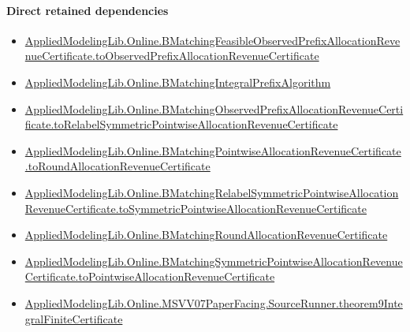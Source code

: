 \documentclass[10pt]{article}
\begin{document}
\paragraph{Direct retained dependencies}
\begin{itemize}\raggedright
\item \hyperlink{governing-declaration-26be68259782c8e2}{Applied\allowbreak{}Modeling\allowbreak{}Lib.\allowbreak{}Online.\allowbreak{}B\allowbreak{}Matching\allowbreak{}Feasible\allowbreak{}Observed\allowbreak{}Prefix\allowbreak{}Allocation\allowbreak{}Revenue\allowbreak{}Certificate.\allowbreak{}to\allowbreak{}Observed\allowbreak{}Prefix\allowbreak{}Allocation\allowbreak{}Revenue\allowbreak{}Certificate}
\item \hyperlink{governing-declaration-736ec20594878fea}{Applied\allowbreak{}Modeling\allowbreak{}Lib.\allowbreak{}Online.\allowbreak{}B\allowbreak{}Matching\allowbreak{}Integral\allowbreak{}Prefix\allowbreak{}Algorithm}
\item \hyperlink{governing-declaration-6c57a9ba136af21f}{Applied\allowbreak{}Modeling\allowbreak{}Lib.\allowbreak{}Online.\allowbreak{}B\allowbreak{}Matching\allowbreak{}Observed\allowbreak{}Prefix\allowbreak{}Allocation\allowbreak{}Revenue\allowbreak{}Certificate.\allowbreak{}to\allowbreak{}Relabel\allowbreak{}Symmetric\allowbreak{}Pointwise\allowbreak{}Allocation\allowbreak{}Revenue\allowbreak{}Certificate}
\item \hyperlink{governing-declaration-ac1ddd9b41e42644}{Applied\allowbreak{}Modeling\allowbreak{}Lib.\allowbreak{}Online.\allowbreak{}B\allowbreak{}Matching\allowbreak{}Pointwise\allowbreak{}Allocation\allowbreak{}Revenue\allowbreak{}Certificate.\allowbreak{}to\allowbreak{}Round\allowbreak{}Allocation\allowbreak{}Revenue\allowbreak{}Certificate}
\item \hyperlink{governing-declaration-833b5953f571b9db}{Applied\allowbreak{}Modeling\allowbreak{}Lib.\allowbreak{}Online.\allowbreak{}B\allowbreak{}Matching\allowbreak{}Relabel\allowbreak{}Symmetric\allowbreak{}Pointwise\allowbreak{}Allocation\allowbreak{}Revenue\allowbreak{}Certificate.\allowbreak{}to\allowbreak{}Symmetric\allowbreak{}Pointwise\allowbreak{}Allocation\allowbreak{}Revenue\allowbreak{}Certificate}
\item \hyperlink{governing-declaration-ff95aa44af6615ac}{Applied\allowbreak{}Modeling\allowbreak{}Lib.\allowbreak{}Online.\allowbreak{}B\allowbreak{}Matching\allowbreak{}Round\allowbreak{}Allocation\allowbreak{}Revenue\allowbreak{}Certificate}
\item \hyperlink{governing-declaration-6c00d92dc638b8f1}{Applied\allowbreak{}Modeling\allowbreak{}Lib.\allowbreak{}Online.\allowbreak{}B\allowbreak{}Matching\allowbreak{}Symmetric\allowbreak{}Pointwise\allowbreak{}Allocation\allowbreak{}Revenue\allowbreak{}Certificate.\allowbreak{}to\allowbreak{}Pointwise\allowbreak{}Allocation\allowbreak{}Revenue\allowbreak{}Certificate}
\item \hyperlink{governing-declaration-42cb1d69a1436db5}{Applied\allowbreak{}Modeling\allowbreak{}Lib.\allowbreak{}Online.\allowbreak{}MSVV07\allowbreak{}Paper\allowbreak{}Facing.\allowbreak{}Source\allowbreak{}Runner.\allowbreak{}theorem9\allowbreak{}Integral\allowbreak{}Finite\allowbreak{}Certificate}
\end{itemize}
\end{document}
